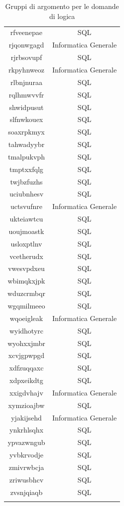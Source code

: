 \begin{longtable}{|c|c|}
rfveenepae & SQL \\
rjqonwgagd & Informatica Generale \\
rjrbsovupf & SQL \\
rkpyhnweoz & Informatica Generale \\
rlbnjnuraa & SQL \\
rqlhmwvvfr & SQL \\
shwidpusut & SQL \\
slfnwkouex & SQL \\
soaxrpkmyx & SQL \\
tahwadyybr & SQL \\
tmalpukvph & SQL \\
tmptxxfqlg & SQL \\
twjbzfuzhs & SQL \\
uciubnhesv & SQL \\
uctsvufnre & Informatica Generale \\
ukteiawtcu & SQL \\
uoujmoastk & SQL \\
usloxptlnv & SQL \\
vcetherudx & SQL \\
vwesvpdxeu & SQL \\
wbimqkxjpk & SQL \\
wduzcrmbqr & SQL \\
wgqmilmeeo & SQL \\
wqoeigleak & Informatica Generale \\
wyidhotyrc & SQL \\
wyohxxjmbr & SQL \\
xcvjgpwpgd & SQL \\
xdfzuqqaxc & SQL \\
xdpxeikdtg & SQL \\
xxigdvhajv & Informatica Generale \\
xymzioajbw & SQL \\
yjakijsehd & Informatica Generale \\
ynkrhlsqhx & SQL \\
ypvazwngub & SQL \\
yvbkrvodje & SQL \\
zmivrwbcja & SQL \\
zriwusbhcv & SQL \\
zvsnjqiaqb & SQL \\
\hline
	
\caption{Gruppi di argomento per le domande di logica}\label{tab:Gruppi di argomento per le domande SQL}
\end{longtable}
\noindent
